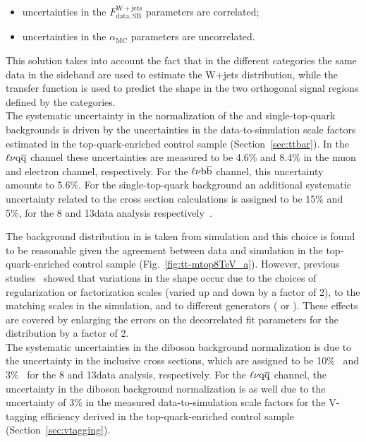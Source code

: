 \begin{itemize}
\item uncertainties in the $F_\mathrm{data, SB}^{\mathrm{W+jets}}$ parameters are correlated;
\item uncertainties in the $\alpha_\mathrm{MC}$ parameters are uncorrelated.
\end{itemize}

This solution takes into account the fact that in the different \mJ categories the same data in the sideband are used to estimate the W+jets distribution, while the transfer function is used to predict the shape in the two orthogonal signal regions defined by the categories.\\

The systematic uncertainty in the normalization of the \ttbar and single-top-quark backgrounds is driven by the uncertainties in the data-to-simulation scale factors estimated in the top-quark-enriched control sample (Section~\ref{sec:ttbar}). In the $\ell\nu\mathrm{q}\overline{\mathrm{q}}$ channel these uncertainties are measured to be 4.6\% and 8.4\% in the muon and electron channel, respectively. For the $\ell\nu{\mathrm{b}\overline{\mathrm{b}}}$ channel, this uncertainty amounts to 5.6\%.
For the single-top-quark background an additional systematic uncertainty related to the cross section calculations is assigned to be 15\% and 5\%, for the 8 and 13\TeV data analysis respectively~\cite{Chatrchyan:2012ep,Kant:2014oha}.

The \ttbar background distribution in \mlvj is taken from simulation and this choice is found to be reasonable given the
agreement between data and simulation in the top-quark-enriched control sample (Fig.~\ref{fig:tt-mtop8TeV_a}).
However, previous studies~\cite{Khachatryan:2014gha} showed that variations in the shape occur due to the choices of regularization or factorization scales (varied up and down by a factor of 2),
to the matching scales in the \MADGRAPH{} simulation, and to different generators (\MADGRAPH{} or \POWHEG{}).
These effects are covered by enlarging the errors on the decorrelated fit parameters for the \ttbar distribution by a factor of 2.\\

The systematic uncertainties in the diboson background normalization is due to the uncertainty in the inclusive cross sections, which are assigned to be 10\%~\cite{Chatrchyan:2013oev} and 3\%~\cite{Gehrmann:2014fva} for the 8 and 13\TeV data analysis, respectively.
For the $\ell\nu\mathrm{q}\overline{\mathrm{q}}$ channel, the uncertainty in the diboson background normalization is as well due to the uncertainty of 3\% in the measured data-to-simulation scale factors for the V-tagging efficiency derived in the top-quark-enriched control sample (Section~\ref{sec:vtagging}).\\

